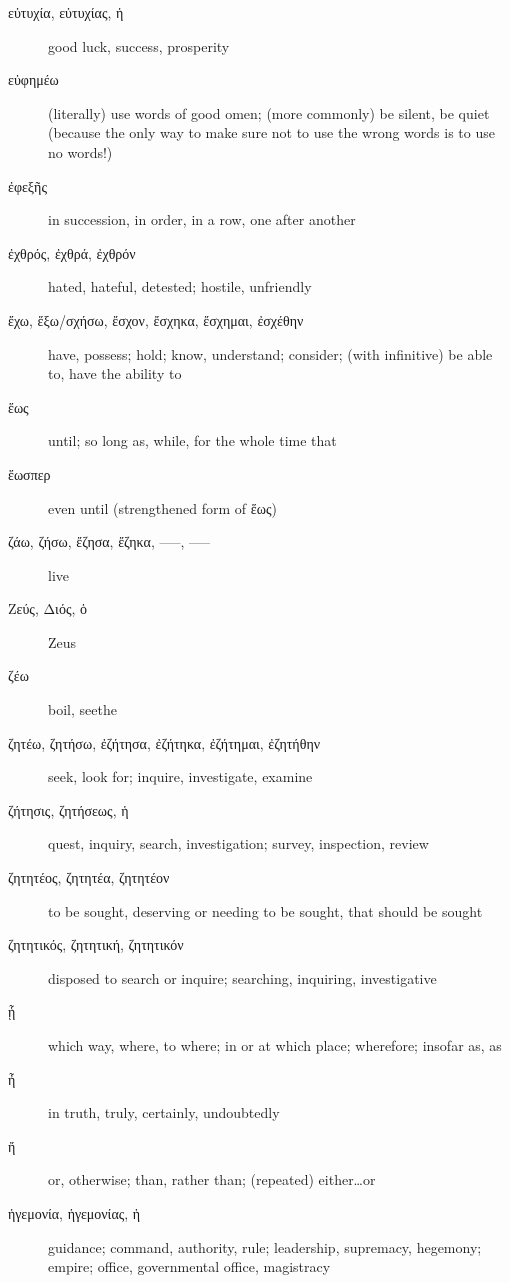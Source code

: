 \documentclass[12pt,letterpaper]{article}
\begin{document}
\begin{description}
    \item[\textgreek{εὐτυχία, εὐτυχίας, ἡ}] good luck, success, prosperity
    \item[\textgreek{εὐφημέω}] (literally) use words of good omen; (more commonly) be silent, be quiet (because the only way to make sure not to use the wrong words is to use no words!)
    \item[\textgreek{ἐφεξῆς}] in succession, in order, in a row, one after another
    \item[\textgreek{ἐχθρός, ἐχθρά, ἐχθρόν}] \marginnote{*}hated, hateful, detested; hostile, unfriendly
    \item[\textgreek{ἔχω, ἕξω/σχήσω, ἔσχον, ἔσχηκα, ἔσχημαι, ἐσχέθην}] \marginnote{*}have, possess; hold; know, understand; consider; (with infinitive) be able to, have the ability to
    \item[\textgreek{ἕως}] \marginnote{*}until; so long as, while, for the whole time that
    \item[\textgreek{ἕωσπερ}] even until (strengthened form of \textgreek{ἕως})
    \item[\textgreek{ζάω, ζήσω, ἔζησα, ἔζηκα, –––, –––}] \marginnote{*}live
    \item[\textgreek{Ζεύς, Διός, ὁ}] Zeus
    \item[\textgreek{ζέω}] boil, seethe
    \item[\textgreek{ζητέω, ζητήσω, ἐζήτησα, ἐζήτηκα, ἐζήτημαι, ἐζητήθην}] \marginnote{*}seek, look for; inquire, investigate, examine
    \item[\textgreek{ζήτησις, ζητήσεως, ἡ}] quest, inquiry, search, investigation; survey, inspection, review
    \item[\textgreek{ζητητέος, ζητητέα, ζητητέον}] to be sought, deserving or needing to be sought, that should be sought
    \item[\textgreek{ζητητικός, ζητητική, ζητητικόν}] disposed to search or inquire; searching, inquiring, investigative
    \item[\textgreek{ᾗ}] which way, where, to where; in or at which place; wherefore; insofar as, as
    \item[\textgreek{ἦ}] in truth, truly, certainly, undoubtedly
    \item[\textgreek{ἤ}] \marginnote{*}or, otherwise; than, rather than; (repeated) either\dots or
    \item[\textgreek{ἡγεμονία, ἡγεμονίας, ἡ}] guidance; command, authority, rule; leadership, supremacy, hegemony; empire; office, governmental office, magistracy

\end{description}
\end{document}
